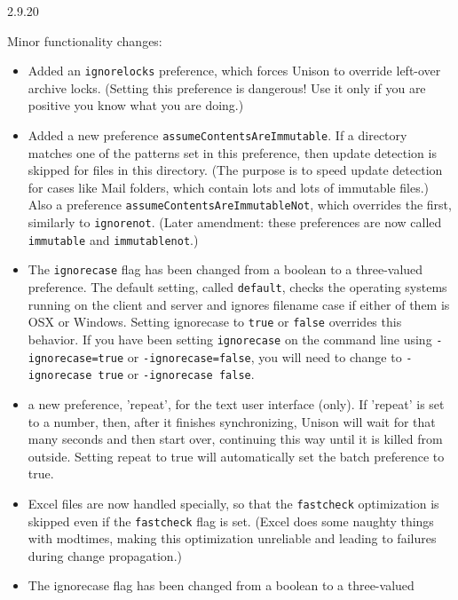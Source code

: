 \begin{changesfromversion}{2.9.20}
\item Minor functionality changes:
\begin{itemize}
\item Added an {\tt ignorelocks} preference, which forces Unison to override left-over
  archive locks.  (Setting this preference is dangerous!  Use it only if you
  are positive you know what you are doing.)
\item Added a new preference {\tt assumeContentsAreImmutable}.  If a directory
  matches one of the patterns set in this preference, then update detection
  is skipped for files in this directory.  (The
  purpose is to speed update detection for cases like Mail folders, which
  contain lots and lots of immutable files.)  Also a preference
  {\tt assumeContentsAreImmutableNot}, which overrides the first, similarly
  to {\tt ignorenot}.  (Later amendment: these preferences are now called
  {\tt immutable} and {\tt immutablenot}.)
\item The {\tt ignorecase} flag has been changed from a boolean to a three-valued
  preference.  The default setting, called {\tt default}, checks the operating systems
  running on the client and server and ignores filename case if either of them is
  OSX or Windows.  Setting ignorecase to {\tt true} or {\tt false} overrides
  this behavior.  If you have been setting {\tt ignorecase} on the command
  line using {\tt -ignorecase=true} or {\tt -ignorecase=false}, you will
  need to change to {\tt -ignorecase true} or {\tt -ignorecase false}.
\item a new preference, 'repeat', for the text user interface (only).  If 'repeat' is set to
  a number, then, after it finishes synchronizing, Unison will wait for that many seconds and
  then start over, continuing this way until it is killed from outside.  Setting repeat to true
  will automatically set the batch preference to true.
\item Excel files are now handled specially, so that the {\tt fastcheck}
  optimization is skipped even if the {\tt fastcheck} flag is set.  (Excel
  does some naughty things with modtimes, making this optimization
  unreliable and leading to failures during change propagation.)
\item The ignorecase flag has been changed from a boolean to a three-valued

\end{itemize}
\end{changesfromversion}
